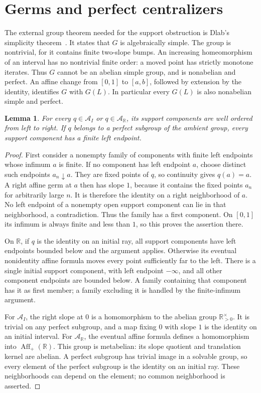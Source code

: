 \documentclass[10pt]{article}
\newtheorem{lemma}[theorem]{Lemma}
\theoremstyle{definition}
\newcommand{\R}{\mathbb R}
\newcommand{\Aff}{\operatorname{Aff}}
\newcommand{\AI}{\mathcal A_I}
\newcommand{\AR}{\mathcal A_{\R}}
\begin{document}
\section{Germs and perfect centralizers}

The external group theorem needed for the support obstruction is Dlab's
simplicity theorem~\cite[Theorem~4.3]{Dlab}. It states that $G$ is
algebraically simple. The group is nontrivial, for it contains finite
two-slope bumps. An increasing homeomorphism of an interval has no
nontrivial finite order: a moved point has strictly monotone iterates.
Thus $G$ cannot be an abelian simple group, and is nonabelian and
perfect. An affine change from $[0,1]$ to $[a,b]$, followed by extension
by the identity, identifies $G$ with $G(L)$. In particular every $G(L)$
is also nonabelian simple and perfect.

\begin{lemma}\label{lem:wellordered}
For every $q\in\AI$ or $q\in\AR$, its support components are
well ordered from left to right. If $q$ belongs to a perfect subgroup
of the ambient group, every support component has a finite left endpoint.
\end{lemma}

\begin{proof}
First consider a nonempty family of components with finite left
endpoints whose infimum $a$ is finite. If no component has left endpoint
$a$, choose distinct such endpoints $a_n\downarrow a$. They are fixed
points of $q$, so continuity gives $q(a)=a$. A right affine germ at $a$
then has slope $1$, because it contains the fixed points $a_n$ for
arbitrarily large $n$. It is therefore the identity on a right
neighborhood of $a$. No left endpoint of a nonempty open support
component can lie in that neighborhood, a contradiction. Thus the
family has a first component. On $[0,1]$ its infimum is always finite
and less than $1$, so this proves the assertion there.

On $\R$, if $q$ is the identity on an initial ray, all support components
have left endpoints bounded below and the argument applies. Otherwise
its eventual nonidentity affine formula moves every point sufficiently
far to the left. There is a single initial support component, with left
endpoint $-\infty$, and all other component endpoints are bounded
below. A family containing that component has it as first member; a
family excluding it is handled by the finite-infimum argument.

For $\AI$, the right slope at $0$ is a homomorphism to the abelian
group $\R_{>0}^{\times}$. It is trivial on any perfect subgroup, and a
map fixing $0$ with slope $1$ is the identity on an initial interval.
For $\AR$, the eventual affine formula defines a homomorphism into
$\Aff_+(\R)$. This group is metabelian: its slope quotient and
translation kernel are abelian. A perfect subgroup has trivial image
in a solvable group, so every element of the perfect subgroup is the
identity on an initial ray. These neighborhoods can depend on the
element; no common neighborhood is asserted.
\end{proof}
\end{document}

